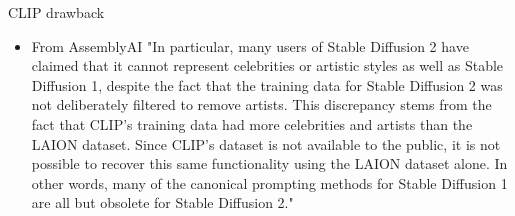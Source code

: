 \documentclass[8pt]{beamer}
\begin{document}
\begin{frame}{CLIP drawback}
    \begin{itemize}
        \item From AssemblyAI "In particular, many users of Stable Diffusion 2 have claimed that it cannot represent celebrities or artistic styles as well as Stable Diffusion 1, despite the fact that the training data for Stable Diffusion 2 was not deliberately filtered to remove artists. This discrepancy stems from the fact that CLIP's training data had more celebrities and artists than the LAION dataset. Since CLIP's dataset is not available to the public, it is not possible to recover this same functionality using the LAION dataset alone. In other words, many of the canonical prompting methods for Stable Diffusion 1 are all but obsolete for Stable Diffusion 2."~\cite{assamblyaiclip}
    \end{itemize}
\end{frame}
\end{document}
